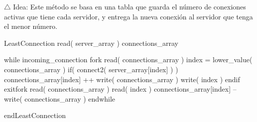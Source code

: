 
$\triangle$ Idea: Este método se basa en una tabla que guarda el número de conexiones activas que tiene cada servidor, y entrega la nueva conexión
al servidor que tenga el menor número.\\

\begin{verbatimtab}[\myTabs]

LeastConnection
	read( server_array )
	connections_array
	
	while incoming_connection
		fork
			read( connections_array )
			index = lower_value( connections_array )
			if( connect2( server_array[index] ) )
				connections_array[index] ++
				write( connections_array )
				write( index )
			endif
		exitfork
		read( connections_array )
		read( index )
		connections_array[index] --
		write( connections_array )
	endwhile

endLeastConnection\\

\end{verbatimtab}\\

